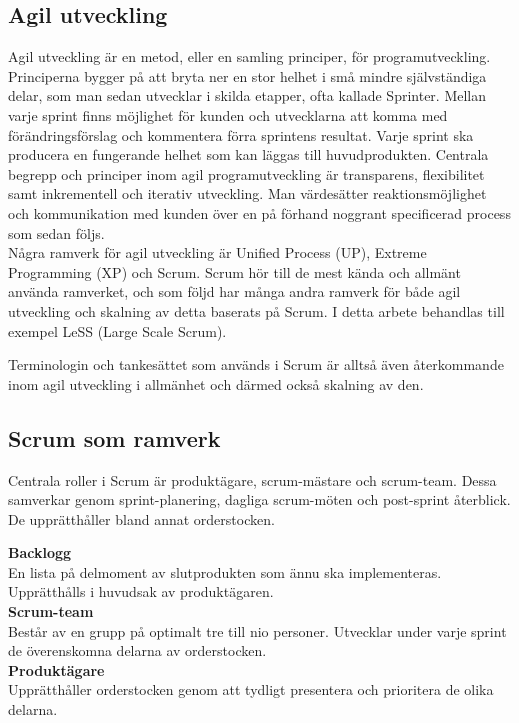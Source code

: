 	\subsection{Agil utveckling}
	
		Agil utveckling är en metod, eller en samling principer, för programutveckling. Principerna bygger på att bryta ner en stor helhet i små mindre självständiga delar, som man sedan utvecklar i skilda etapper, ofta kallade Sprinter.
		Mellan varje sprint finns möjlighet för kunden och utvecklarna att komma med förändringsförslag och kommentera förra sprintens resultat. Varje sprint ska producera en fungerande helhet som kan läggas till huvudprodukten. Centrala begrepp och principer inom agil programutveckling är transparens, flexibilitet samt inkrementell och iterativ utveckling. Man värdesätter reaktionsmöjlighet och kommunikation med kunden över en på förhand noggrant specificerad process som sedan följs. \cite{agile_manifesto}
		\\
		Några ramverk för agil utveckling är Unified Process (UP), Extreme Programming (XP) och Scrum.
		Scrum hör till de mest kända och allmänt använda ramverket, och som följd har många andra ramverk för både agil utveckling och skalning av detta baserats på Scrum. I detta arbete behandlas till exempel LeSS (Large Scale Scrum).
		
		Terminologin och tankesättet som används i Scrum är alltså även återkommande inom agil utveckling i allmänhet och därmed också skalning av den.
		
	\subsection{Scrum som ramverk}	
		Centrala roller i Scrum är produktägare, scrum-mästare och scrum-team. Dessa samverkar genom sprint-planering, dagliga scrum-möten och post-sprint återblick. De upprätthåller bland annat orderstocken.
		
		\textbf{Backlogg} \\
		En lista på delmoment av slutprodukten som ännu ska implementeras. Upprätthålls i huvudsak av produktägaren. \\	
		
		\textbf{Scrum-team} \\
		Består av en grupp på optimalt tre till nio personer. Utvecklar under varje sprint de överenskomna delarna av orderstocken. \\
		
		\textbf{Produktägare} \\
		Upprätthåller orderstocken genom att tydligt presentera och prioritera de olika delarna. \\
		
